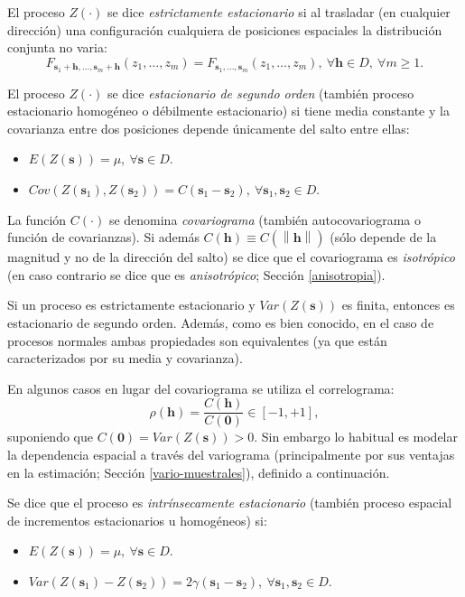 \documentclass[
]{book}
\theoremstyle{break}
\theoremstyle{definition}
\theoremstyle{definition}
\theoremstyle{definition}
\theoremstyle{definition}
\theoremstyle{remark}
\begin{document}
El proceso \(Z(\cdot)\) se dice \emph{estrictamente estacionario} si al trasladar (en cualquier dirección) una configuración cualquiera de posiciones espaciales la distribución conjunta no varia:
\[F_{\mathbf{s}_1 +\mathbf{h}, \ldots,\mathbf{s}_m +\mathbf{h}}(z_1, \ldots, z_m) = F_{\mathbf{s}_1, \ldots, \mathbf{s}_m}(z_1, \ldots, z_m),\ \forall \mathbf{h}\in D,\ \forall m\geq 1.\]

El proceso \(Z(\cdot)\) se dice \emph{estacionario de segundo orden} (también proceso estacionario homogéneo o débilmente estacionario) si tiene media constante y la covarianza entre dos posiciones depende únicamente del salto entre ellas:

\begin{itemize}
\item
  \(E(Z(\mathbf{s}))=\mu,\ \forall \mathbf{s}\in D\).
\item
  \(Cov(Z(\mathbf{s}_1), Z(\mathbf{s}_2)) = C(\mathbf{s}_1 -\mathbf{s}_2),\ \forall \mathbf{s}_1 ,\mathbf{s}_2 \in D\).
\end{itemize}

La función \(C(\cdot)\) se denomina \emph{covariograma} (también autocovariograma o función de covarianzas).
Si además \(C(\mathbf{h}) \equiv C(\left\| \mathbf{h}\right\|)\) (sólo depende de la magnitud y no de la dirección del salto) se dice que el covariograma es \emph{isotrópico} (en caso contrario se dice que es \emph{anisotrópico}; Sección \ref{anisotropia}).

Si un proceso es estrictamente estacionario y \(Var(Z(\mathbf{s}))\) es finita, entonces es estacionario de segundo orden.
Además, como es bien conocido, en el caso de procesos normales ambas propiedades son equivalentes (ya que están caracterizados por su media y covarianza).

En algunos casos en lugar del covariograma se utiliza el correlograma:
\[\rho (\mathbf{h}) = \dfrac{C(\mathbf{h})}{C(\mathbf{0})} \in \left[-1,+1\right],\]
suponiendo que \(C(\mathbf{0}) = Var(Z(\mathbf{s})) >0\).
Sin embargo lo habitual es modelar la dependencia espacial a través del variograma (principalmente por sus ventajas en la estimación; Sección \ref{vario-muestrales}), definido a continuación.

Se dice que el proceso es \emph{intrínsecamente estacionario} (también proceso espacial de incrementos estacionarios u homogéneos) si:

\begin{itemize}
\item
  \(E(Z(\mathbf{s}))=\mu,\ \forall \mathbf{s}\in D\).
\item
  \(Var(Z(\mathbf{s}_1)-Z(\mathbf{s}_2)) = 2\gamma (\mathbf{s}_1 - \mathbf{s}_2),\ \forall \mathbf{s}_1 ,\mathbf{s}_2 \in D\).
\end{itemize}
\end{document}
